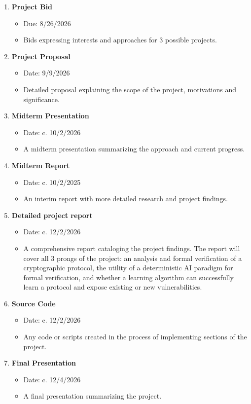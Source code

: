\documentclass[11pt]{article}
\begin{document}
\begin{enumerate}
    \item \textbf{Project Bid}
    \begin{itemize}
        \item Due: 8/26/2026
        \item Bids expressing interests and approaches for 3 possible projects.
    \end{itemize}
    \item \textbf{Project Proposal}
    \begin{itemize}
        \item Date: 9/9/2026
        \item Detailed proposal explaining the scope of the project, motivations and significance. 
    \end{itemize}
    \item \textbf{Midterm Presentation}
    \begin{itemize}
        \item Date: c. 10/2/2026
        \item A midterm presentation summarizing the approach and current progress.
    \end{itemize}
    \item \textbf{Midterm Report}
    \begin{itemize}
        \item Date: c. 10/2/2025
        \item An interim report with more detailed research and project findings. 
    \end{itemize}
    \item \textbf{Detailed project report}
    \begin{itemize}
        \item Date: c. 12/2/2026
        \item A comprehensive report cataloging the project findings. The report will cover all 3 prongs of the project: an analysis and formal verification of a cryptographic protocol, the utility of a deterministic AI paradigm for formal verification, and whether a learning algorithm can successfully learn a protocol and expose existing or new vulnerabilities. 
    \end{itemize}
    \item \textbf{Source Code}
    \begin{itemize}
        \item Date: c. 12/2/2026
        \item Any code or scripts created in the process of implementing sections of the project.
    \end{itemize}
    \item \textbf{Final Presentation}
    \begin{itemize}
        \item Date: c. 12/4/2026
        \item A final presentation summarizing the project.
    \end{itemize}
\end{enumerate}
\end{document}
